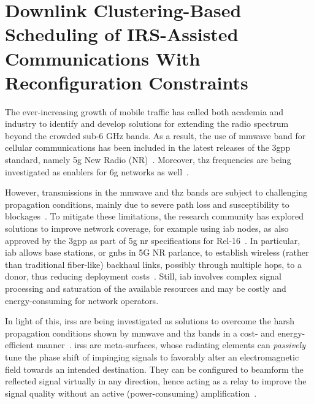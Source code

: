 \chapter{Downlink Clustering-Based Scheduling of IRS-Assisted Communications With Reconfiguration Constraints}
\label{sec:introduction}

The ever-increasing growth of mobile traffic has called both academia and industry to identify and develop solutions for extending the radio spectrum beyond the crowded sub-6 GHz bands. As a result, the use of \gls{mmwave} band for cellular communications has been included in the latest releases of the \gls{3gpp}  standard, namely \gls{5g} New Radio (NR)~\cite{3gpp.38.104}. Moreover, \gls{thz} frequencies are being investigated as enablers for \gls{6g} networks as well~\cite{tariq2020speculative}.

However, transmissions in the \gls{mmwave} and \gls{thz} bands are subject to challenging propagation conditions, mainly due to severe path loss and susceptibility to blockages~\cite{rangan2017potentials}.
To mitigate these limitations, the research community has explored solutions to improve network coverage, for example using \gls{iab} nodes, as also approved by the \gls{3gpp} as part of \gls{5g} \gls{nr} specifications for Rel-16~\cite{3gpp.38.174}.
In particular, \gls{iab} allows base stations, or \glspl{gnb} in 5G NR parlance, to establish wireless (rather than traditional fiber-like) backhaul links, possibly through multiple hops,  to a donor, thus reducing deployment costs~\cite{polese2020integrated}. Still, \gls{iab} involves complex signal processing and saturation of the available resources and may be costly and energy-consuming for network operators.

In light of this, \glspl{irs} are being investigated as solutions to overcome the harsh propagation conditions shown by \gls{mmwave} and \gls{thz} bands in a cost- and energy-efficient manner~\cite{flamini2022towards}. 
\glspl{irs} are meta-surfaces, whose radiating elements can \emph{passively} tune the phase shift of impinging signals to favorably alter an electromagnetic field towards an intended destination. They can be configured to beamform the reflected signal virtually in any direction, hence acting as a relay to improve the signal quality without an active (power-consuming) amplification~\cite{bjornson2019intelligent}. 

